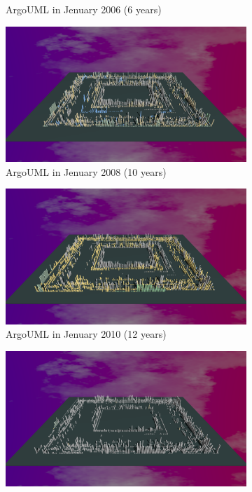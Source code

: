 \begin{figure}[ht]
\begin{subfigure}{0.48\textwidth}
        \caption{ArgoUML in Jenuary 2006 (6 years)} 
        \label{fig:ArgoUML_V3_S3}
    \end{subfigure}\hspace*{\fill}
    \begin{subfigure}{0.48\textwidth}
        \includegraphics[width=\linewidth]{ArgoUML/Animation010.png}
        \caption{ArgoUML in Jenuary 2008 (10 years)} 
        \label{fig:ArgoUML_V3_S4}
    \end{subfigure}
    \medskip
    \begin{subfigure}{0.48\textwidth}
        \includegraphics[width=\linewidth]{ArgoUML/Animation012.png}
        \caption{ArgoUML in Jenuary 2010 (12 years)} 
        \label{fig:ArgoUML_V3_S5}
    \end{subfigure}\hspace*{\fill}
    \begin{subfigure}{0.48\textwidth}
        \includegraphics[width=\linewidth]{ArgoUML/Animation022.png}

\end{subfigure}
\end{figure}
